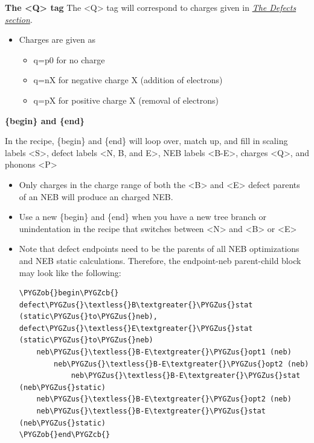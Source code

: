 \documentclass[letterpaper,10pt,english]{sphinxmanual}
\def\PYGZus{\char`\_}
\def\PYGZob{\char`\{}
\def\PYGZcb{\char`\}}
\begin{document}
\textbf{The \textless{}Q\textgreater{} tag}
The \textless{}Q\textgreater{} tag will correspond to charges given in {\hyperref[3_1_5_defects::doc]{\emph{The Defects section}}}.
\begin{itemize}
\item {} 
Charges are given as
\begin{itemize}
\item {} 
q=p0 for no charge

\item {} 
q=nX for negative charge X (addition of electrons)

\item {} 
q=pX for positive charge X (removal of electrons)

\end{itemize}

\end{itemize}

\textbf{\{begin\} and \{end\}}

In the recipe, \{begin\} and \{end\} will loop over, match up, and fill in scaling labels \textless{}S\textgreater{}, defect labels \textless{}N, B, and E\textgreater{}, NEB labels \textless{}B-E\textgreater{}, charges \textless{}Q\textgreater{}, and phonons \textless{}P\textgreater{}
\begin{itemize}
\item {} 
Only charges in the charge range of both the \textless{}B\textgreater{} and \textless{}E\textgreater{} defect parents of an NEB will produce an charged NEB.

\item {} 
Use a new \{begin\} and \{end\} when you have a new tree branch or unindentation in the recipe that switches between \textless{}N\textgreater{} and \textless{}B\textgreater{} or \textless{}E\textgreater{}

\item {} 
Note that defect endpoints need to be the parents of all NEB optimizations and NEB static calculations. Therefore, the endpoint-neb parent-child block may look like the following:

\begin{Verbatim}[commandchars=\\\{\}]
\PYGZob{}begin\PYGZcb{}
defect\PYGZus{}\textless{}B\textgreater{}\PYGZus{}stat (static\PYGZus{}to\PYGZus{}neb), defect\PYGZus{}\textless{}E\textgreater{}\PYGZus{}stat (static\PYGZus{}to\PYGZus{}neb)
    neb\PYGZus{}\textless{}B-E\textgreater{}\PYGZus{}opt1 (neb)
        neb\PYGZus{}\textless{}B-E\textgreater{}\PYGZus{}opt2 (neb)
            neb\PYGZus{}\textless{}B-E\textgreater{}\PYGZus{}stat (neb\PYGZus{}static)
    neb\PYGZus{}\textless{}B-E\textgreater{}\PYGZus{}opt2 (neb)
    neb\PYGZus{}\textless{}B-E\textgreater{}\PYGZus{}stat (neb\PYGZus{}static)
\PYGZob{}end\PYGZcb{}
\end{Verbatim}

\end{itemize}
\end{document}

